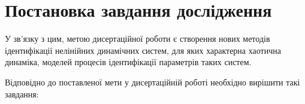 %
%
%

\section{Постановка завдання дослідження}%



У зв'язку з цим, метою дисертаційної роботи є створення
нових методів ідентифікації нелінійних динамічних систем,
для яких характерна хаотична динаміка,
моделей процесів ідентифікації параметрів таких систем.

Відповідно до поставленої мети у дисертаційній роботі необхідно
вирішити такі завдання:

